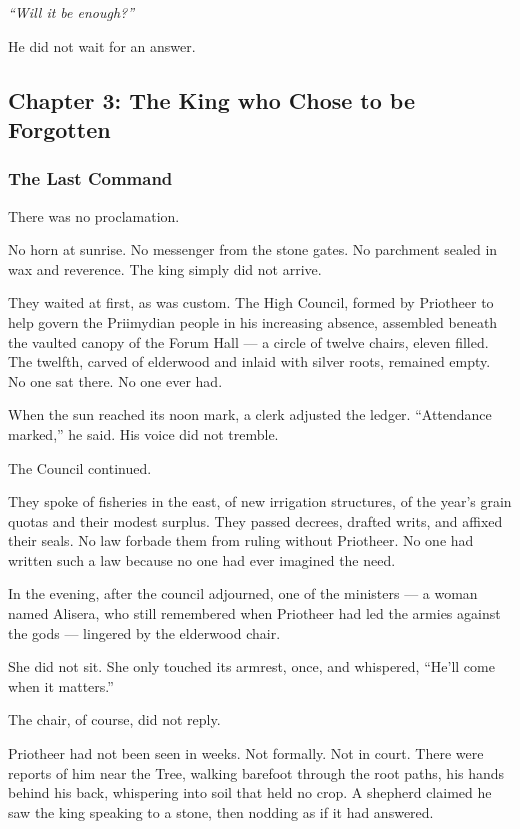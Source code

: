 \documentclass[12pt]{article}
\begin{document}
\vspace{0.5em}
\textit{``Will it be enough?''}

\vspace{0.5em}
He did not wait for an answer.

\newpage

\subsection{Chapter 3: The King who Chose to be Forgotten}

\vspace{.5in}

\subsubsection{The Last Command}

There was no proclamation.

No horn at sunrise. No messenger from the stone gates. No parchment sealed in wax and reverence. The king simply did not arrive.

They waited at first, as was custom. The High Council, formed by Priotheer to help govern the Priimydian people in his increasing absence, assembled beneath the vaulted canopy of the Forum Hall — a circle of twelve chairs, eleven filled. The twelfth, carved of elderwood and inlaid with silver roots, remained empty. No one sat there. No one ever had.

When the sun reached its noon mark, a clerk adjusted the ledger. “Attendance marked,” he said. His voice did not tremble.

The Council continued.

They spoke of fisheries in the east, of new irrigation structures, of the year’s grain quotas and their modest surplus. They passed decrees, drafted writs, and affixed their seals. No law forbade them from ruling without Priotheer. No one had written such a law because no one had ever imagined the need.

In the evening, after the council adjourned, one of the ministers — a woman named Alisera, who still remembered when Priotheer had led the armies against the gods — lingered by the elderwood chair.

She did not sit. She only touched its armrest, once, and whispered, “He’ll come when it matters.”

The chair, of course, did not reply.

Priotheer had not been seen in weeks. Not formally. Not in court. There were reports of him near the Tree, walking barefoot through the root paths, his hands behind his back, whispering into soil that held no crop. A shepherd claimed he saw the king speaking to a stone, then nodding as if it had answered.
\end{document}
